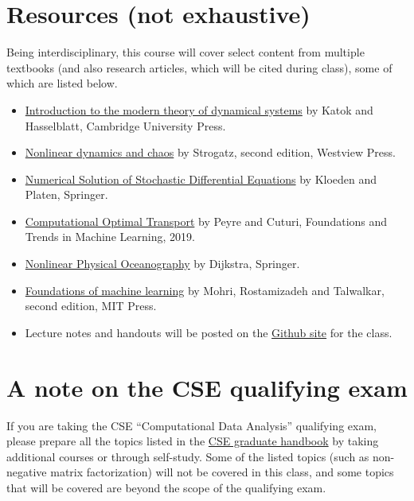 \documentclass[12pt]{article}
\begin{document}
\section{Resources (not exhaustive)}
\label{sec:resources}
Being interdisciplinary, this course will cover select content from multiple textbooks (and also research articles, which will be cited during class), some of which are listed below. 
\begin{itemize}
	\item 
		\href{https://books.google.com/books?hl=en&lr=&id=9nL7ZX8Djp4C&oi=fnd&pg=PR7&dq=katok+and+hasselblatt&ots=oWieU2cCAH&sig=T-g4-msNhCCTTpoSyMb09ZhnF2Y#v=onepage&q=katok%20and%20hasselblatt&f=false}{Introduction to the modern theory of dynamical systems} by Katok and Hasselblatt, Cambridge University Press.
	\item  \href{https://books.google.com/books?hl=en&lr=&id=wUBvDwAAQBAJ&oi=fnd&pg=PT7&ots=AOtaTsiIyX&sig=MexxyAiFbXhsxZNKq6V7YLjjv5w#v=onepage&q&f=false}{Nonlinear dynamics and chaos} by Strogatz, second edition, Westview Press.
	\item \href{https://link.springer.com/book/10.1007/978-3-662-12616-5}{Numerical Solution of Stochastic Differential Equations} by Kloeden and Platen, Springer. 

	\item \href{https://www.nowpublishers.com/article/Details/MAL-073}{Computational Optimal Transport} by Peyre and Cuturi, Foundations and Trends in Machine Learning, 2019.
	\item \href{https://books.google.com/books?hl=en&lr=&id=vaFKLXvfSaUC&oi=fnd&pg=PR9&dq=henk+dijkstra&ots=DCHHbStuIf&sig=ibiNU5CqYdT-Fo37v1FUIpuLs1o#v=onepage&q=henk%20dijkstra&f=false}{Nonlinear Physical Oceanography} by Dijkstra, Springer.	
	\item \href{https://books.google.com/books?hl=en&lr=&id=dWB9DwAAQBAJ&oi=fnd&pg=PR5&dq=foundations+of+machine+learning+mohri&ots=AznTXOq_s4&sig=oFBecq2rS2nusMY-xRj1qD-0Dsk#v=onepage&q=foundations%20of%20machine%20learning%20mohri&f=false}{Foundations of machine learning} by Mohri, Rostamizadeh and Talwalkar, second edition, MIT Press. 
	\item Lecture notes and handouts will be posted on the \href{https://github.com/ni-sha-c/}{Github site} for the class.

\end{itemize}
\section{A note on the CSE qualifying exam}
If you are taking the CSE ``Computational Data Analysis'' qualifying exam, please prepare all the topics listed in the \href{https://cse.gatech.edu/sites/default/files/documents/2023/Handbook-2023-06-07.pdf}{CSE graduate handbook} by taking additional courses or through self-study. Some of the listed topics (such as non-negative matrix factorization) will not be covered in this class, and some topics that will be covered are beyond the scope of the qualifying exam.
\
\end{document}
